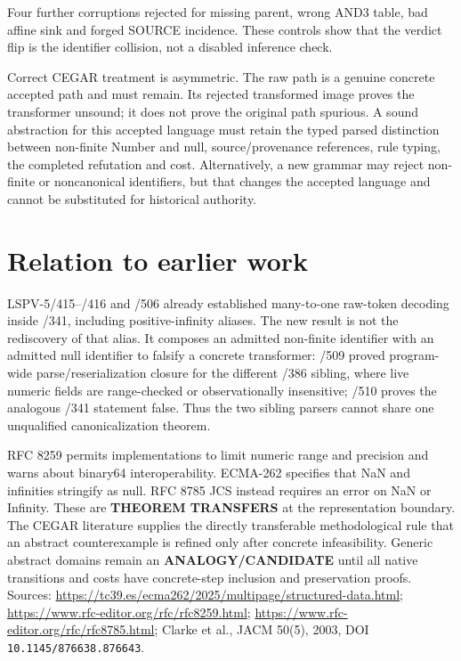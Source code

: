 \documentclass[11pt]{article}
\begin{document}
Four further corruptions rejected for missing parent, wrong AND3 table, bad
affine sink and forged SOURCE incidence.  These controls show that the verdict
flip is the identifier collision, not a disabled inference check.

Correct CEGAR treatment is asymmetric.  The raw path is a genuine concrete
accepted path and must remain.  Its rejected transformed image proves the
transformer unsound; it does not prove the original path spurious.  A sound
abstraction for this accepted language must retain the typed parsed distinction
between non-finite Number and null, source/provenance references, rule typing,
the completed refutation and cost.  Alternatively, a new grammar may reject
non-finite or noncanonical identifiers, but that changes the accepted language
and cannot be substituted for historical authority.

\section{Relation to earlier work}
LSPV-5/415--/416 and /506 already established many-to-one raw-token decoding
inside /341, including positive-infinity aliases.  The new result is not the
rediscovery of that alias.  It composes an admitted non-finite identifier with
an admitted null identifier to falsify a concrete transformer: /509 proved
program-wide parse/reserialization closure for the different /386 sibling,
where live numeric fields are range-checked or observationally insensitive;
/510 proves the analogous /341 statement false.  Thus the two sibling parsers
cannot share one unqualified canonicalization theorem.

RFC 8259 permits implementations to limit numeric range and precision and
warns about binary64 interoperability.  ECMA-262 specifies that NaN and
infinities stringify as null.  RFC 8785 JCS instead requires an error on NaN or
Infinity.  These are \textbf{THEOREM TRANSFERS} at the representation boundary.
The CEGAR literature supplies the directly transferable methodological rule
that an abstract counterexample is refined only after concrete infeasibility.
Generic abstract domains remain an \textbf{ANALOGY/CANDIDATE} until all native
transitions and costs have concrete-step inclusion and preservation proofs.
Sources: \url{https://tc39.es/ecma262/2025/multipage/structured-data.html};
\url{https://www.rfc-editor.org/rfc/rfc8259.html};
\url{https://www.rfc-editor.org/rfc/rfc8785.html}; Clarke et al., JACM 50(5),
2003, DOI \texttt{10.1145/876638.876643}.
\end{document}
